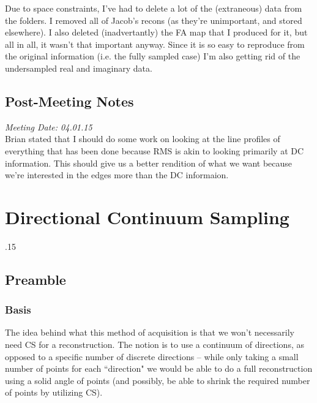 \documentclass[11 pt]{article}
\let\oldsection\section
\renewcommand\section{\clearpage\newpage\oldsection}
\begin{document}
  Due to space constraints, I've had to delete a lot of the (extraneous) data from the folders. I removed all of Jacob's recons (as they're unimportant, and stored elsewhere). I also deleted (inadvertantly) the FA map that I produced for it, but all in all, it wasn't that important anyway. Since it is so easy to reproduce from the original information (i.e. the fully sampled case) I'm also getting rid of the undersampled real and imaginary data. 
  
  \subsection{Post-Meeting Notes}
  
  \emph{Meeting Date: 04.01.15}\\
  Brian stated that I should do some work on looking at the line profiles of everything that has been done because RMS is akin to looking primarily at DC information. This should give us a better rendition of what we want because we're interested in the edges more than the DC informaion. 
  

\section{Directional Continuum Sampling}
  
  .15
  \subsection{Preamble}
    
    \subsubsection{Basis}
      The idea behind what this method of acquisition is that we won't necessarily need CS for a reconstruction. The notion is to use a continuum of directions, as opposed to a specific number of discrete directions --  while only taking a small number of points for each ``direction" we would be able to do a full reconstruction using a solid angle of points (and possibly, be able to shrink the required number of points by utilizing CS). 
    
\end{document}
